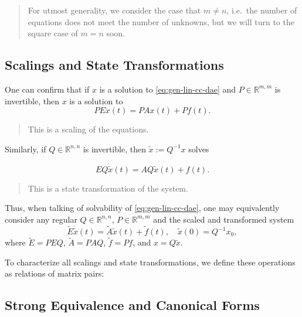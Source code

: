 \documentclass[]{book}
\newenvironment {JHSAYS} [0] {\begin{quote}\color{jhsc}} {\end{quote}}
\theoremstyle{definition}
\theoremstyle{definition}
\theoremstyle{definition}
\theoremstyle{definition}
\theoremstyle{remark}
\begin{document}
\begin{JHSAYS}
For utmost generality, we consider the case that \(m\neq n\), i.e.~the
number of equations does not meet the number of unknowns, but we will
turn to the square case of \(m=n\) soon.
\end{JHSAYS}

\hypertarget{scalings-and-state-transformations}{%
\subsection{Scalings and State Transformations}\label{scalings-and-state-transformations}}

One can confirm that if \(x\) is a solution to \eqref{eq:gen-lin-cc-dae} and \(P\in \mathbb R^{m,m}\) is invertible, then \(x\) is a solution to
\begin{equation*}
PE \dot x (t) = PAx(t) + Pf(t).
\end{equation*}

\begin{JHSAYS}
This is a scaling of the equations.
\end{JHSAYS}

Similarly, if \(Q\in \mathbb R^{n,n}\) is invertible, then \(\tilde x := Q^{-1}x\) solves

\begin{equation*}
E Q \dot {\tilde x} (t) = AQ \tilde x(t) + f(t).
\end{equation*}

\begin{JHSAYS}
This is a state transformation of the system.
\end{JHSAYS}

Thus, when talking of solvability of \eqref{eq:gen-lin-cc-dae}, one may equivalently consider any regular \(Q\in \mathbb R^{n,n}\), \(P\in \mathbb R^{m,m}\) and the scaled and transformed system
\begin{equation}
\tilde E \dot{\tilde x}(t) = \tilde A \tilde x (t) + \tilde f(t), \quad \tilde x(0) = Q^{-1}x_0,
\end{equation}
where \(\tilde E = PEQ\), \(\tilde A = PAQ\), \(\tilde f = Pf\), and \(x=Q\tilde x\).

To characterize all scalings and state transformations, we define these operations as relations of matrix pairs:

\hypertarget{strong-equivalence-and-canonical-forms}{%
\subsection{Strong Equivalence and Canonical Forms}\label{strong-equivalence-and-canonical-forms}}
\end{document}
